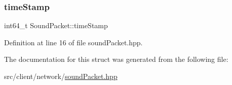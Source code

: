 \subsubsection{\texorpdfstring{time\+Stamp}{timeStamp}}
{\footnotesize\ttfamily int64\+\_\+t Sound\+Packet\+::time\+Stamp}



Definition at line 16 of file sound\+Packet.\+hpp.



The documentation for this struct was generated from the following file\+:\begin{DoxyCompactItemize}
\item 
src/client/network/\mbox{\hyperlink{sound_packet_8hpp}{sound\+Packet.\+hpp}}\end{DoxyCompactItemize}
